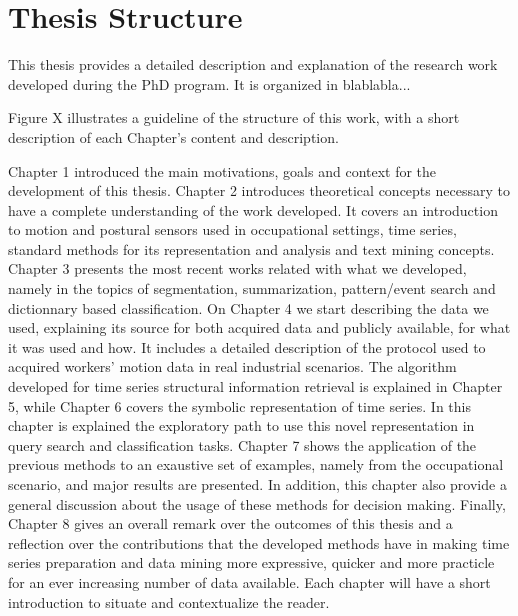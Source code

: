 \section{Thesis Structure}
\label{sec:structure}

This thesis provides a detailed description and explanation of the research work developed during the PhD program. It is organized in blablabla...


Figure X illustrates a guideline of the structure of this work, with a short description of each Chapter's content and description.

Chapter 1 introduced the main motivations, goals and context for the development of this thesis. Chapter 2 introduces theoretical concepts necessary to have a complete understanding of the work developed. It covers an introduction to motion and postural sensors used in occupational settings, time series, standard methods for its representation and analysis and text mining concepts. Chapter 3 presents the most recent works related with what we developed, namely in the topics of segmentation, summarization, pattern/event search and dictionnary based classification. On Chapter 4 we start describing the data we used, explaining its source for both acquired data and publicly available, for what it was used and how. It includes a detailed description of the protocol used to acquired workers' motion data in real industrial scenarios. The algorithm developed for time series structural information retrieval is explained in Chapter 5, while Chapter 6 covers the symbolic representation of time series. In this chapter is explained the exploratory path to use this novel representation in query search and classification tasks. Chapter 7 shows the application of the previous methods to an exaustive set of examples, namely from the occupational scenario, and major results are presented. In addition, this chapter also provide a general discussion about the usage of these methods for decision making. Finally, Chapter 8 gives an overall remark over the outcomes of this thesis and a reflection over the contributions that the developed methods have in making time series preparation and data mining more expressive, quicker and more practicle for an ever increasing number of data available. Each chapter will have a short introduction to situate and contextualize the reader.
